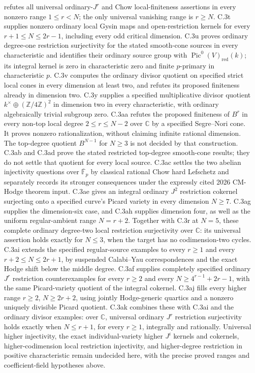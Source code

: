 refutes all universal ordinary-$J^r$ and Chow local-finiteness
assertions in every nonzero range $1\le r<N$; the only
universal vanishing range is $r\ge N$.
C.3t supplies nonzero ordinary local Gysin maps and
open-restriction kernels for every $r+1\le N\le2r-1$,
including every odd critical dimension.
C.3u proves ordinary degree-one restriction surjectivity for
the stated smooth-cone sources in every characteristic and
identifies their ordinary source group with
$\operatorname{Pic}^0(V)_{\mathrm{red}}(k)$; its integral kernel
is zero in characteristic zero and finite $p$-primary in
characteristic $p$.
C.3v computes the ordinary divisor quotient on specified
strict local cones in every dimension at least two,
and refutes its proposed finiteness already in dimension two.
C.3y supplies a specified multiplicative divisor quotient
$k^\times\oplus(\mathbb Z/4\mathbb Z)^2$ in dimension two
in every characteristic, with ordinary algebraically
trivial subgroup zero.
C.3aa refutes the proposed finiteness of $B^r$ in every
non-top local degree $2\le r\le N-2$ over $\mathbb C$ by a
specified Segre--Nori cone. It proves nonzero rationalization,
without claiming infinite rational dimension. The top-degree
quotient $B^{N-1}$ for $N\ge3$ is not decided by that construction.
C.3ab and C.3ad prove the stated restricted top-degree
smooth-cone results; they do not settle that quotient for
every local source. C.3ac settles the two abelian
injectivity questions over $\overline{\mathbb F}_p$ by
classical rational Chow hard Lefschetz and separately
records its stronger consequences under the expressly
cited 2026 CM-Hodge theorem input.
C.3ae gives an integral ordinary $J^2$ restriction cokernel
surjecting onto a specified curve's Picard variety in every
dimension $N\ge7$. C.3ag supplies the dimension-six case,
and C.3ah supplies dimension four, as well as the uniform
regular-ambient range $N=r+2$. Together with C.3r at $N=5$,
these complete ordinary degree-two local restriction
surjectivity over $\mathbb C$: its universal assertion
holds exactly for $N\le3$, when the target has no
codimension-two cycles.
C.3ai extends the specified regular-source examples to every
$r\ge1$ and every $r+2\le N\le2r+1$, by suspended
Calabi--Yau correspondences and the exact Hodge shift below
the middle degree.
C.3af supplies completely specified ordinary $J^r$
restriction counterexamples for every $r\ge2$ and every
$N\ge4^{r-1}+2r-1$, with the same Picard-variety quotient
of the integral cokernel. C.3aj fills every higher range
$r\ge2$, $N\ge2r+2$, using jointly Hodge-generic quartics
and a nonzero uniquely divisible Picard quotient.
C.3ak combines these with C.3ai and the ordinary divisor
examples: over $\mathbb C$, universal ordinary $J^r$
restriction surjectivity holds exactly when $N\le r+1$,
for every $r\ge1$, integrally and rationally.
Universal higher injectivity, the exact individual-variety
higher $J^i$ kernels and cokernels, higher-codimension local
restriction injectivity, and higher-degree restriction in
positive characteristic remain undecided here, with the
precise proved ranges and coefficient-field hypotheses above.

